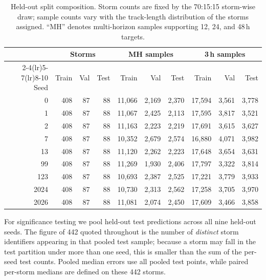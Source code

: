 \documentclass{ametsocv6.1}
\begin{document}
\begin{table}[ht]
\centering
\footnotesize
\begin{tabular}{@{}rrrrrrrrrr@{}}
\toprule
& \multicolumn{3}{c}{Storms} & \multicolumn{3}{c}{MH samples}
& \multicolumn{3}{c}{3\,h samples} \\
\cmidrule(lr){2-4}\cmidrule(lr){5-7}\cmidrule(lr){8-10}
Seed & Train & Val & Test & Train & Val & Test & Train & Val & Test \\
\midrule
0    & 408 & 87 & 88 & 11{,}066 & 2{,}169 & 2{,}370 & 17{,}594 & 3{,}561 & 3{,}778 \\
1    & 408 & 87 & 88 & 11{,}067 & 2{,}425 & 2{,}113 & 17{,}595 & 3{,}817 & 3{,}521 \\
2    & 408 & 87 & 88 & 11{,}163 & 2{,}223 & 2{,}219 & 17{,}691 & 3{,}615 & 3{,}627 \\
7    & 408 & 87 & 88 & 10{,}352 & 2{,}679 & 2{,}574 & 16{,}880 & 4{,}071 & 3{,}982 \\
13   & 408 & 87 & 88 & 11{,}120 & 2{,}262 & 2{,}223 & 17{,}648 & 3{,}654 & 3{,}631 \\
99   & 408 & 87 & 88 & 11{,}269 & 1{,}930 & 2{,}406 & 17{,}797 & 3{,}322 & 3{,}814 \\
123  & 408 & 87 & 88 & 10{,}693 & 2{,}387 & 2{,}525 & 17{,}221 & 3{,}779 & 3{,}933 \\
2024 & 408 & 87 & 88 & 10{,}730 & 2{,}313 & 2{,}562 & 17{,}258 & 3{,}705 & 3{,}970 \\
2026 & 408 & 87 & 88 & 11{,}081 & 2{,}074 & 2{,}450 & 17{,}609 & 3{,}466 & 3{,}858 \\
\bottomrule
\end{tabular}
\caption{Held-out split composition. Storm counts are fixed by the 70:15:15
storm-wise draw; sample counts vary with the track-length distribution of the
storms assigned. ``MH'' denotes multi-horizon samples supporting 12, 24, and
48\,h targets.}
\label{tab:splits}
\end{table}

For significance testing we pool held-out test predictions across all nine
held-out seeds. The figure of 442 quoted throughout is the number of \emph{distinct}
storm identifiers appearing in that pooled test sample; because a storm may fall
in the test partition under more than one seed, this is smaller than the sum of
the per-seed test counts. Pooled median errors use all pooled test points, while
paired per-storm medians are defined on these 442 storms.
\end{document}
